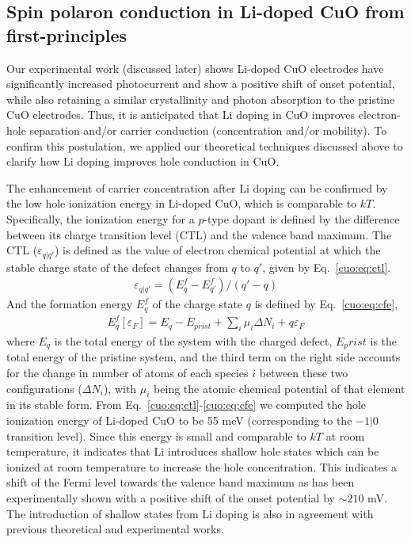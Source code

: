 \subsection{Spin polaron conduction in Li-doped CuO from first-principles}
Our experimental work (discussed later) shows Li-doped CuO electrodes have significantly increased photocurrent and show a positive shift of onset potential, while also retaining a similar crystallinity and photon absorption to the pristine CuO electrodes. Thus, it is anticipated that Li doping in CuO improves electron-hole separation and/or carrier conduction (concentration and/or mobility). To confirm this postulation, we applied our theoretical techniques discussed above to clarify how Li doping improves hole conduction in CuO.

The enhancement of carrier concentration after Li doping can be confirmed by the low hole ionization energy in Li-doped CuO, which is comparable to $kT$. Specifically, the ionization energy for a $p$-type dopant is defined by the difference between its charge transition level (CTL) and the valence band maximum. The CTL ($\varepsilon_{q|q'}$) is defined as the value of electron chemical potential at which the stable charge state of the defect changes from $q$ to $q'$, given by Eq.~\ref{cuo:eq:ctl}.
\begin{align}
    \varepsilon_{q|q'} = \left( E_q^f - E_{q'}^f \right) / (q' - q)
    \label{cuo:eq:ctl}
\end{align}
And the formation energy $E_q^f$ of the charge state $q$ is defined by Eq.~\ref{cuo:eq:cfe},
\begin{align}
    E_q^f [\varepsilon_F ]=E_q-E_{prist}+\sum_i \mu_i \Delta N_i +q\varepsilon_F
    \label{cuo:eq:cfe}
\end{align}
where $E_q$ is the total energy of the system with the charged defect, $E_prist$ is the total energy of the pristine system, and the third term on the right side accounts for the change in number of atoms of each species $i$ between these two configurations ($\Delta N_i$), with $\mu_i$ being the atomic chemical potential of that element in its stable form. From Eq.~\ref{cuo:eq:ctl}-\ref{cuo:eq:cfe} we computed the hole ionization energy of Li-doped CuO to be 55 meV (corresponding to the $-1|0$ transition level). Since this energy is small and comparable to $kT$ at room temperature, it indicates that Li introduces shallow hole states which can be ionized at room temperature to increase the hole concentration. This indicates a shift of the Fermi level towards the valence band maximum as has been experimentally shown with a positive shift of the onset potential by $\sim 210$ mV. The introduction of shallow states from Li doping is also in agreement with previous theoretical and experimental works.\cite{zheng2004fast,choi2017p}

